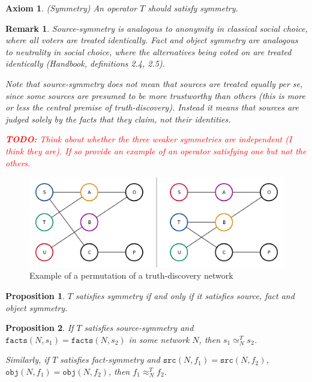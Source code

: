 \documentclass{article}
\theoremstyle{definition} \newtheorem{definition}{Definition}
\theoremstyle{definition} \newtheorem{example}{Example}
\theoremstyle{plain} \newtheorem{axiom}{Axiom}
\theoremstyle{plain} \newtheorem*{remark}{Remark}
\theoremstyle{remark} \newtheorem*{notation}{Notation}
\theoremstyle{plain} \newtheorem{lemma}{Lemma}
\theoremstyle{plain} \newtheorem{theorem}{Theorem}
\theoremstyle{plain} \newtheorem{proposition}{Proposition}
\newcommand{\todo}[1] {
    \textcolor{red}{
        \textbf{TODO:} #1
    }
}
\newcommand{\seq}{\simeq}
\newcommand{\feq}{\approx}
\newcommand{\src}{\texttt{src}}
\newcommand{\fact}{\texttt{facts}}
\newcommand{\obj}{\texttt{obj}}
\begin{document}
\begin{axiom}(Symmetry)
\label{axiom:symm}
An operator $T$ should satisfy symmetry.
\end{axiom}

\begin{remark}
Source-symmetry is analogous to \emph{anonymity} in classical social choice,
where all voters are treated identically. Fact and object symmetry are
analogous to \emph{neutrality} in social choice, where the alternatives being
voted on are treated identically (Handbook, definitions 2.4, 2.5).

Note that source-symmetry does not mean that sources are treated \emph{equally}
per se, since some sources are presumed to be more trustworthy than others
(this is more or less the central premise of truth-discovery). Instead it means
that sources are judged solely by the facts that they claim, not their
identities.

\todo{Think about whether the three weaker symmetries are independent (I think
they are). If so provide an example of an operator satisfying one but not the
others.}
\end{remark}

\begin{figure}
    \centering
    \includegraphics[width=\linewidth]{symmetry_example}
    \caption{Example of a permutation of a truth-discovery network}
    \label{img:permutation_of_a_tdn}
\end{figure}

\begin{proposition}
\label{prop:symm_iff_fact_source_object_symm}
$T$ satisfies symmetry if and only if it satisfies source, fact and object
symmetry.
\end{proposition}

\begin{proposition}
\label{prop:same_facts_ranked_equally}
If $T$ satisfies source-symmetry and $\fact(N, s_1) = \fact(N, s_2)$ in some
network $N$, then $s_1 \seq_N^T s_2$.

Similarly, if $T$ satisfies fact-symmetry and $\src(N, f_1) = \src(N, f_2)$,
$\obj(N, f_1) = \obj(N, f_2)$, then $f_1 \feq_N^T f_2$.
\end{proposition}
\end{document}
